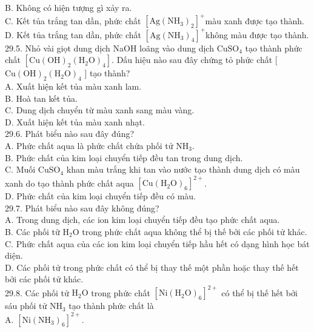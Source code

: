 \documentclass[10pt]{article}
\begin{document}
B. Không có hiện tượng gì xảy ra.\\
C. Kết tủa trắng tan dần, phức chất $\left[\mathrm{Ag}\left(\mathrm{NH}_{3}\right)_{2}\right]^{+}$màu xanh được tạo thành.\\
D. Kết tủa trắng tan dần, phức chất $\left[\mathrm{Ag}\left(\mathrm{NH}_{3}\right)_{4}\right]^{+}$không màu được tạo thành.\\
29.5. Nhỏ vài giọt dung dịch NaOH loãng vào dung dịch $\mathrm{CuSO}_{4}$ tạo thành phức chất $\left[\mathrm{Cu}(\mathrm{OH})_{2}\left(\mathrm{H}_{2} \mathrm{O}\right)_{4}\right]$. Dấu hiệu nào sau đây chứng tỏ phức chất [ $\mathrm{Cu}(\mathrm{OH})_{2}\left(\mathrm{H}_{2} \mathrm{O}\right)_{4}$ ] tạo thành?\\
A. Xuất hiện kết tủa màu xanh lam.\\
B. Hoà tan kết tủa.\\
C. Dung dịch chuyển từ màu xanh sang màu vàng.\\
D. Xuất hiện kết tủa màu xanh nhạt.\\
29.6. Phát biểu nào sau đây đúng?\\
A. Phức chất aqua là phức chất chứa phối tử $\mathrm{NH}_{3}$.\\
B. Phức chất của kim loại chuyển tiếp đều tan trong dung dịch.\\
C. Muối $\mathrm{CuSO}_{4}$ khan màu trắng khi tan vào nước tạo thành dung dịch có màu xanh do tạo thành phức chất aqua $\left[\mathrm{Cu}\left(\mathrm{H}_{2} \mathrm{O}\right)_{6}\right]^{2+}$.\\
D. Phức chất của kim loại chuyển tiếp đều có màu.\\
29.7. Phát biểu nào sau đây không đúng?\\
A. Trong dung dịch, các ion kim loại chuyển tiếp đều tạo phức chất aqua.\\
B. Các phối tữ $\mathrm{H}_{2} \mathrm{O}$ trong phức chất aqua không thể bị thế bởi các phối tử khác.\\
C. Phức chất aqua của các ion kim loại chuyển tiếp hầu hết có dạng hình học bát diện.\\
D. Các phối tử trong phức chất có thể bị thay thế một phần hoặc thay thế hết bởi các phối tử khác.\\
29.8. Các phối tử $\mathrm{H}_{2} \mathrm{O}$ trong phức chất $\left[\mathrm{Ni}\left(\mathrm{H}_{2} \mathrm{O}\right)_{6}\right]^{2+}$ có thể bị thế hết bởi sáu phối tử $\mathrm{NH}_{3}$ tạo thành phức chất là\\
A. $\left[\mathrm{Ni}\left(\mathrm{NH}_{3}\right)_{6}\right]^{2+}$.\\
\end{document}
